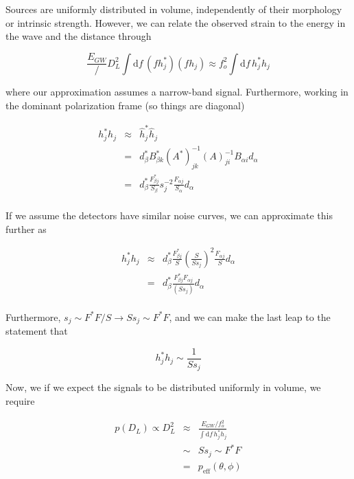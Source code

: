 \documentclass[10pt]{article}
\begin{document}
Sources are uniformly distributed in volume, independently of their morphology or intrinsic strength. However, we can relate the observed strain to the energy in the wave and the distance through

\begin{equation}
\frac{E_{GW}}/D_L^2 \int\mathrm{d}f\, (f h_{j}^\ast)(f h_{j}) \approx f_o^2 \int\mathrm{d}f\, h_{j}^\ast h_{j}
\end{equation}

where our approximation assumes a narrow-band signal. Furthermore, working in the dominant polarization frame (so things are diagonal)

\begin{eqnarray}
h_{j}^\ast h_{j} & \approx & \hat{h}_j^\ast \hat{h}_j \\
                 & = & d_\beta^\ast B_{\beta k}^\ast \left(A^\ast\right)_{jk}^{-1} \left(A\right)_{ji}^{-1} B_{\alpha i} d_\alpha \\
                 & = & d_\beta^\ast \frac{F_{\beta j}^\ast}{S_\beta} s_j^{-2} \frac{F_{\alpha j}}{S_\alpha} d_\alpha \\
\end{eqnarray}

If we assume the detectors have similar noise curves, we can approximate this further as

\begin{eqnarray}
h_{j}^\ast h_{j} & \approx & d_\beta^\ast \frac{F_{\beta j}^\ast}{S} \left(\frac{S}{S s_j}\right)^{2} \frac{F_{\alpha j}}{S} d_\alpha \\
                 & = & d_\beta^\ast \frac{F_{\beta j}^\ast F_{\alpha j}}{\left(S s_j\right)} d_\alpha \\
\end{eqnarray}

Furthermore, $s_j\sim F^\ast F/ S \rightarrow S s_j \sim F^\ast F$, and we can make the last leap to the statement that

\begin{equation}
h_{j}^\ast h_{j} \sim \frac{1}{S s_j}
\end{equation}

Now, we if we expect the signals to be distributed uniformly in volume, we require

\begin{eqnarray}
p(D_L) \propto D_L^2 & \approx & \frac{E_{GW}/f_o^2}{\int\mathrm{d}f\, h_{j}^\ast h_{j}} \\
                     & \sim & S s_j \sim F^\ast F \\
                     & = & p_{\mathrm{eff}}(\theta,\phi)
\end{eqnarray}
\end{document}

